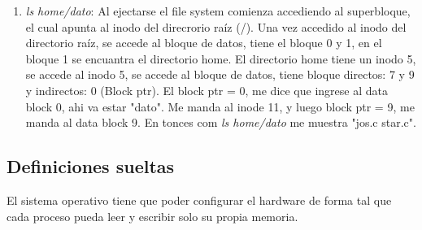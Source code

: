 \documentclass[../main.tex]{subfiles}
\begin{document}
\begin{exercise}
\begin{answer}
            \begin{enumerate}
                \item \textit{ls home/dato}: Al ejectarse el file system comienza accediendo al superbloque, el cual apunta al inodo del direcrorio raíz (/). Una vez accedido al inodo del directorio raíz, se accede al bloque de datos, tiene el bloque 0 y 1, en el bloque 1 se encuantra el directorio home. El directorio home tiene un inodo 5, se accede al inodo 5, se accede al bloque de datos, tiene bloque directos: 7 y 9 y indirectos: 0 (Block ptr). El block ptr = 0, me dice que ingrese al data block 0, ahi va estar "dato". Me manda al inode 11, y luego block ptr = 9, me manda al data block 9. En tonces com \textit{ls home/dato} me muestra "jos.c star.c". 
            \end{enumerate}
        \end{answer}
    \end{exercise}

    
\subsection{Definiciones sueltas}
    El sistema operativo tiene que poder configurar el hardware de forma tal que cada proceso pueda leer y escribir solo su propia memoria.
\end{document}
